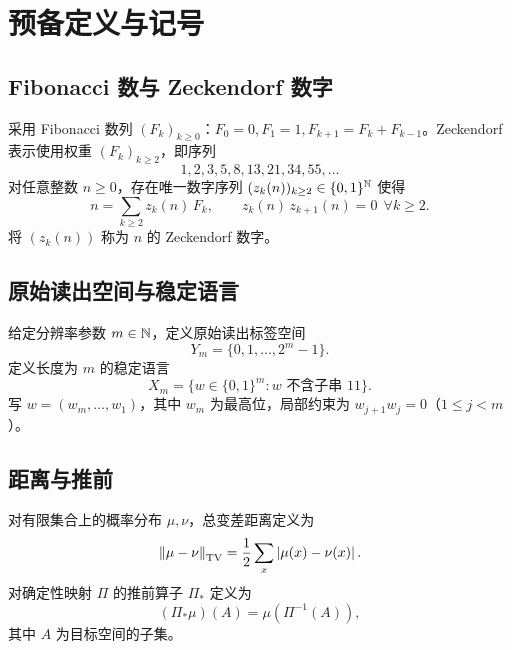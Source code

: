 \section{预备定义与记号}

\subsection{Fibonacci 数与 Zeckendorf 数字}

采用 Fibonacci 数列 $(F_k)_{k\ge 0}$：$F_0=0,F_1=1,F_{k+1}=F_k+F_{k-1}$。Zeckendorf 表示使用权重 $(F_k)_{k\ge 2}$，即序列
\[
1,2,3,5,8,13,21,34,55,\dots
\]
对任意整数 $n\ge 0$，存在唯一数字序列 $(z_k(n))_{k\ge 2}\in\{0,1\}^{\mathbb{N}}$ 使得
\[
n=\sum_{k\ge 2} z_k(n)\,F_k,\qquad z_k(n)\,z_{k+1}(n)=0\ \ \forall k\ge 2.
\]
将 $(z_k(n))$ 称为 $n$ 的 Zeckendorf 数字。

\subsection{原始读出空间与稳定语言}

给定分辨率参数 $m\in\mathbb{N}$，定义原始读出标签空间
\[
Y_m=\{0,1,\dots,2^m-1\}.
\]
定义长度为 $m$ 的稳定语言
\[
X_m=\{w\in\{0,1\}^m:\text{$w$ 不含子串 }11\}.
\]
写 $w=(w_m,\dots,w_1)$，其中 $w_m$ 为最高位，局部约束为 $w_{j+1}w_j=0$（$1\le j<m$）。

\subsection{距离与推前}

对有限集合上的概率分布 $\mu,\nu$，总变差距离定义为
\[
\left\lVert \mu-\nu\right\rVert_{\mathrm{TV}}=\frac{1}{2}\sum_x\left\lvert \mu(x)-\nu(x)\right\rvert.
\]
对确定性映射 $\Pi$ 的推前算子 $\Pi_*$ 定义为
\[
(\Pi_*\mu)(A)=\mu(\Pi^{-1}(A)),
\]
其中 $A$ 为目标空间的子集。

